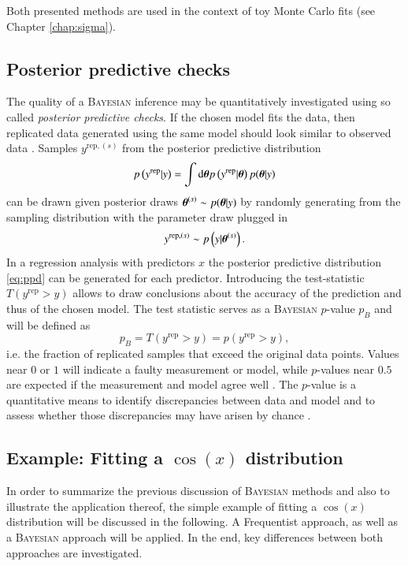 Both presented methods are used in the context of toy Monte Carlo fits (see Chapter \ref{chap:sigma}). 
\subsection{Posterior predictive checks}
The quality of a \textsc{Bayesian} inference may be quantitatively investigated using so called \emph{posterior predictive checks}. If the chosen model fits the data, then replicated data generated using the same model should look similar to observed data \cite{bayes}. Samples $y^{\text{rep}, (s)}$ from the posterior predictive distribution
\begin{equation}
	p\left(y^\text{rep}|y\right)=\int\text{d}\boldsymbol{\theta} p\left(y^\text{rep}|\boldsymbol{\theta} \right)p(\boldsymbol{\theta}|y)
\end{equation}
can be drawn given posterior draws $\boldsymbol{\theta}^{(s)}\sim p(\boldsymbol{\theta}|y)$ by randomly generating from the sampling distribution with the parameter draw plugged in \cite{stan}
\begin{equation}
	\label{eq:ppd}
	y^{\text{rep}, (s)}\sim p\left(y|\boldsymbol{\theta}^{(s)}\right).
\end{equation}
In a regression analysis with predictors $x$ the posterior predictive distribution \eqref{eq:ppd} can be generated for each predictor. Introducing the test-statistic $T\left(y^\text{rep}>y\right)$ allows to draw conclusions about the accuracy of the prediction and thus of the chosen model. The test statistic serves as a \textsc{Bayesian} $p$-value $p_B$ \cite{bayes} and will be defined as \begin{equation}
	p_B=T\left(y^\text{rep}>y\right)=p(y^\text{rep}>y),
\end{equation}
i.e. the fraction of replicated samples that exceed the original data points. Values near $0$ or $1$ will indicate a faulty measurement or model, while $p$-values near $0.5$ are expected if the measurement and model agree well \cite{bayes}. The $p$-value is a quantitative means to identify discrepancies between data and model and to assess whether those discrepancies may have arisen by chance \cite{bayes}.
\subsection{Example: Fitting a $\cos(x)$ distribution}
In order to summarize the previous discussion of \textsc{Bayesian} methods and also to illustrate the application thereof, the simple example of fitting a $\cos(x)$ distribution will be discussed in the following. A Frequentist approach, as well as a \textsc{Bayesian} approach will be applied. In the end, key differences between both approaches are investigated.

